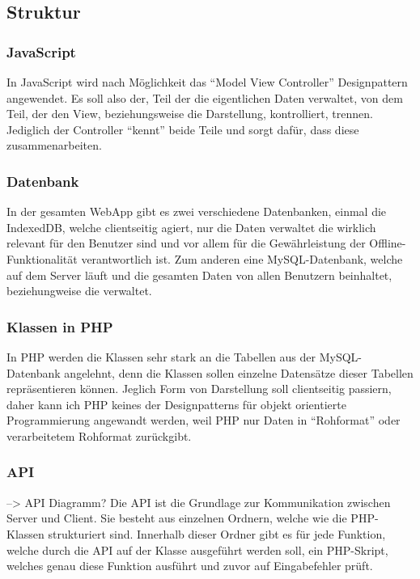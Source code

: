 \documentclass[a4paper,12pt,ngerman,listof=numbered]{scrartcl}      %
\let\oldcite\cite
\renewcommand{\cite}[1]{\textsuperscript{\oldcite{#1}}}
\begin{document}
	\subsection{Struktur}
	\subsubsection{JavaScript}
	In JavaScript wird nach Möglichkeit das ``Model View Controller''\cite{wikiMVC} Design\-pat\-tern angewendet. Es soll also der, Teil der die eigentlichen Daten verwaltet, von dem Teil, der den View, beziehungsweise die Darstellung, kontrolliert, trennen. Jediglich der Controller ``kennt'' beide Teile und sorgt dafür, dass diese zusammenarbeiten.
	\subsubsection{Datenbank}
	In der gesamten WebApp gibt es zwei verschiedene Datenbanken, einmal die IndexedDB, welche clientseitig agiert, nur die Daten verwaltet die wirklich relevant für den Benutzer sind und vor allem für die Gewährleistung der Offline-Funk\-ti\-o\-na\-li\-tät verantwortlich ist.
	Zum anderen eine MySQL-Datenbank, welche auf dem Server läuft und die gesamten Daten von allen Benutzern beinhaltet, beziehungweise die verwaltet.
	\subsubsection{Klassen in PHP}
	In PHP werden die Klassen sehr stark an die Tabellen aus der MySQL-Datenbank angelehnt, denn die Klassen sollen einzelne Datensätze dieser Tabellen repräsentieren können. Jeglich Form von Darstellung soll clientseitig passiern, daher kann ich PHP keines der Designpatterns für objekt orientierte Programmierung angewandt werden, weil PHP nur Daten in ``Rohformat'' oder verarbeitetem Rohformat zurückgibt.\par
	\subsubsection{API}
	--> API Diagramm?
	Die API ist die Grundlage zur Kommunikation zwischen Server und Client. Sie besteht aus einzelnen Ordnern, welche wie die PHP-Klassen strukturiert sind. Innerhalb dieser Ordner gibt es für jede Funktion, welche durch die API auf der Klasse ausgeführt werden soll, ein PHP-Skript, welches genau diese Funktion ausführt und zuvor auf Eingabefehler prüft.\par
	
\end{document}
